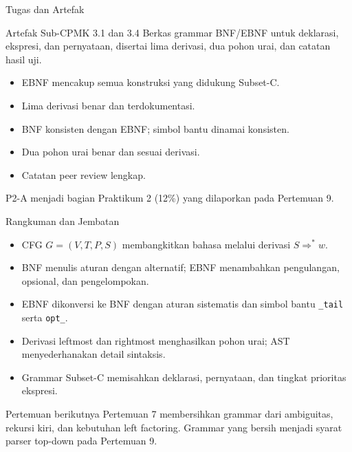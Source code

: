 \documentclass[aspectratio=169,10pt,t]{beamer}
\begin{document}
\begin{frame}{Tugas dan Artefak}
  \begin{block}{Artefak Sub-CPMK 3.1 dan 3.4}
    Berkas grammar BNF/EBNF untuk deklarasi, ekspresi, dan pernyataan,
    disertai lima derivasi, dua pohon urai, dan catatan hasil uji.
  \end{block}

  \small
  \begin{itemize}
    \item EBNF mencakup semua konstruksi yang didukung Subset-C.
    \item Lima derivasi benar dan terdokumentasi.
    \item BNF konsisten dengan EBNF; simbol bantu dinamai konsisten.
    \item Dua pohon urai benar dan sesuai derivasi.
    \item Catatan peer review lengkap.
  \end{itemize}

  \vspace{3pt}
  {\footnotesize\color{ubbblue!75}P2-A menjadi bagian Praktikum 2
  (12\%) yang dilaporkan pada Pertemuan 9.}
\end{frame}

\begin{frame}{Rangkuman dan Jembatan}
  \begin{itemize}
    \item CFG \(G=(V,T,P,S)\) membangkitkan bahasa melalui derivasi
          \(S \Rightarrow^{*} w\).
    \item BNF menulis aturan dengan alternatif; EBNF menambahkan
          pengulangan, opsional, dan pengelompokan.
    \item EBNF dikonversi ke BNF dengan aturan sistematis dan simbol
          bantu \texttt{\_tail} serta \texttt{opt\_}.
    \item Derivasi leftmost dan rightmost menghasilkan pohon urai;
          AST menyederhanakan detail sintaksis.
    \item Grammar Subset-C memisahkan deklarasi, pernyataan, dan
          tingkat prioritas ekspresi.
  \end{itemize}

  \vspace{4pt}
  \begin{exampleblock}{Pertemuan berikutnya}
    Pertemuan 7 membersihkan grammar dari ambiguitas, rekursi kiri,
    dan kebutuhan left factoring. Grammar yang bersih menjadi syarat
    parser top-down pada Pertemuan 9.
  \end{exampleblock}
\end{frame}
\end{document}
